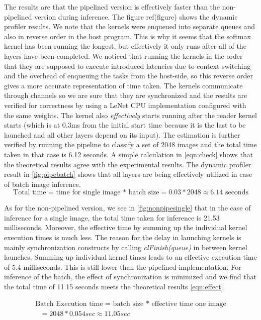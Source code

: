 The results are that the pipelined version is effectively faster than the non-pipelined version during inference. The figure ref(figure) shows the dynamic profiler results. We note that the kernels were enqueued into separate queues and also in reverse order in the host program. This is why it seems that the softmax kernel has been running the longest, but effectively it only runs after all of the layers have been completed. We noticed that running the kernels in the order that they are supposed to execute introduced latencies due to context switching and the overhead of enqueuing the tasks from the host-side, so this reverse order gives a more accurate representation of time taken. The kernels communicate through channels so we are sure that they are synchronized and the results are verified for correctness by using a LeNet CPU implementation configured with the same weights. The kernel also \emph{effectively} starts running after the reader kernel starts (which is at 0.3ms from the initial start time because it is the last to be launched and all other layers depend on its input). 
The estimation is further verified by running the pipeline to classify a set of 2048 images and the total time taken in that case is 6.12 seconds. A simple calculation in \ref{eqn:check} shows that the theoretical results agree with the experimental results. The dynamic profiler result in \ref{fig:pipebatch} shows that all layers are being effectively utilized in case of batch image inference. 
\begin{equation}
\text{Total time = time for single image * batch size} = 0.03 * 2048 \approx 6.14\text{ seconds}
\label{eqn:check}
\end{equation}

As for the non-pipelined version, we see in \ref{fig:nonpipesingle} that in the case of inference for a single image,  the total time taken for inference is 21.53 milliseconds. Moreover, the effective time by summing up the individual kernel execution times is much less. The reason for the delay in launching kernels is mainly synchronization constructs by calling \emph{clFinish(queue)} in between kernel launches. Summing up individual kernel times leads to an effective execution time of 5.4 milliseconds. This is still lower than the pipelined implementation. For inference of the batch, the effect of synchronization is minimized and we find that the total time of 11.15 seconds meets the theoretical results \ref{eqn:effect}.
 
\begin{equation}
\begin{array}{l}

\text{Batch Execution time = batch size * effective time one image} \\
  \text{        } = 2048 * 0.054 sec \approx 11.05 sec
\end{array}
\label{eqn:effect}
\end{equation}


